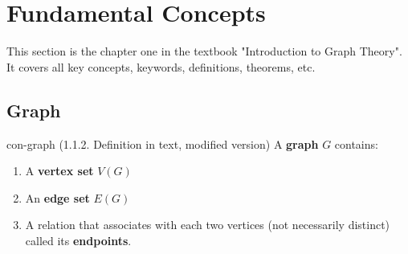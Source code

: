 \documentclass[../src/handouts/main.tex]{subfiles}
\begin{document}
\section{Fundamental Concepts}

\newcommand\bipartitegraphhelper[1]{
  \begin{tikzpicture}[
      point/.style = {circle, fill=black, inner sep=1mm}]
    \def \distance {1.5} %
    \foreach \x in {0,...,3} %
    \foreach \y in {0,...,1} %
    \node[point] (\y\x) at (\x * \distance, \y * - \distance) {};

    \draw (00) -- (10) -- (01) -- (11) -- (03) -- (10);
    \draw (12) -- (02) -- (13);

    \ifthenelse{\isempty{#1}}%
    {}%
    {
      \node at (4 * \distance, 0) {people}
      node at (4 * \distance, - \distance) {jobs};
    }%
  \end{tikzpicture}
}%

\def \bipartitegraph {\bipartitegraphhelper{}}%

\def \bipartitegraphwithlabels {\bipartitegraphhelper{with labels}}%

\def \tripartitegraph {%
  \begin{tikzpicture}[every node/.style = {circle, fill=black, inner sep=1mm}]
    \node (a1) at (-3, 1) {} %
    node (a2) at (-2, 0) {} %
    node (b1) at (-1, 3) {} %
    node (b2) at (0, 3) {} %
    node (b3) at (1, 3) {} %
    node (c1) at (2, 0) {} %
    node (c2) at (3, 1) {}; %
    \draw (b1) -- (a1) -- (b2) -- (a2) -- (c1) -- (b2) -- (c2) -- (b3) -- (c1);
  \end{tikzpicture}
}%

This section is the chapter one in the textbook "Introduction to Graph Theory". It covers all key concepts, keywords, definitions, theorems, etc.

\subsection{Graph}

\begin{definition}{}{con-graph}
  (1.1.2. Definition in text, modified version)
  A \textbf{graph} $G$ contains:
  \begin{enumerate}
    \item A \textbf{vertex set} $V(G)$
    \item An \textbf{edge set} $E(G)$
    \item A relation that associates with each two vertices (not necessarily distinct) called its \textbf{endpoints}.
  \end{enumerate}
\end{definition}
\end{document}
